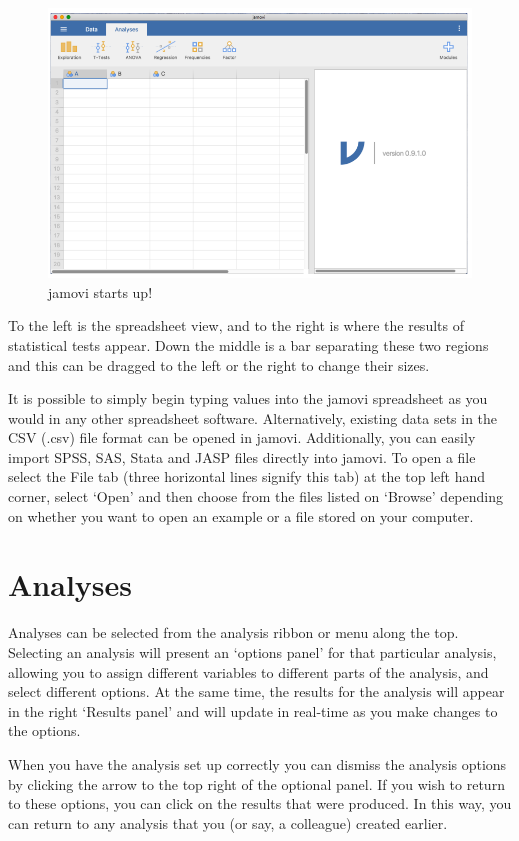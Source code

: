 \documentclass[
]{book}
\begin{document}
\begin{figure}
\includegraphics[width=0.9\linewidth]{images/Figure2} \caption{jamovi starts up!}\label{fig:fig3-1}
\end{figure}

To the left is the spreadsheet view, and to the right is where the results of statistical tests appear. Down the middle is a bar separating these two regions and this can be dragged to the left or the right to change their sizes.

It is possible to simply begin typing values into the jamovi spreadsheet as you would in any other spreadsheet software. Alternatively, existing data sets in the CSV (.csv) file format can be opened in jamovi. Additionally, you can easily import SPSS, SAS, Stata and JASP files directly into jamovi. To open a file select the File tab (three horizontal lines signify this tab) at the top left hand corner, select `Open' and then choose from the files listed on `Browse' depending on whether you want to open an example or a file stored on your computer.

\hypertarget{analyses}{%
\section{Analyses}\label{analyses}}

Analyses can be selected from the analysis ribbon or menu along the top. Selecting an analysis will present an `options panel' for that particular analysis, allowing you to assign different variables to different parts of the analysis, and select different options. At the same time, the results for the analysis will appear in the right `Results panel' and will update in real-time as you make changes to the options.

When you have the analysis set up correctly you can dismiss the analysis options by clicking the arrow to the top right of the optional panel. If you wish to return to these options, you can click on the results that were produced. In this way, you can return to any analysis that you (or say, a colleague) created earlier.
\end{document}
